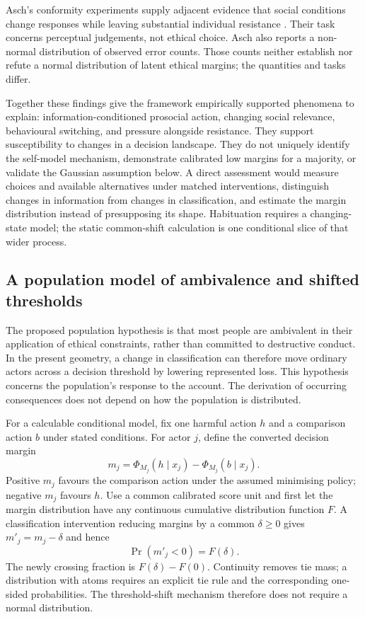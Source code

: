 \documentclass[11pt,a4paper]{article}
\theoremstyle{remark}
\begin{document}
Asch's conformity experiments supply adjacent evidence that social conditions
change responses while leaving substantial individual resistance
\citep{asch1956independence}. Their task concerns perceptual judgements, not
ethical choice. Asch also reports a non-normal distribution of observed error
counts. Those counts neither establish nor refute a normal distribution of
latent ethical margins; the quantities and tasks differ.

Together these findings give the framework empirically supported phenomena to
explain: information-conditioned prosocial action, changing social relevance,
behavioural switching, and pressure alongside resistance. They support
susceptibility to changes in a decision landscape. They do not uniquely identify
the self-model mechanism, demonstrate calibrated low margins for a majority,
or validate the Gaussian assumption below. A direct assessment would measure
choices and available alternatives under matched interventions, distinguish
changes in information from changes in classification, and estimate the
margin distribution instead of presupposing its shape. Habituation requires a
changing-state model; the static common-shift calculation is one conditional
slice of that wider process.

\subsection{A population model of ambivalence and shifted thresholds}

The proposed population hypothesis is that most people are ambivalent in their
application of ethical constraints, rather than committed to destructive conduct.
In the present geometry, a change in classification can therefore move ordinary
actors across a decision threshold by lowering represented loss. This hypothesis
concerns the population's response to the account. The derivation of occurring
consequences does not depend on how the population is distributed.

For a calculable conditional model, fix one harmful action $h$ and a comparison
action $b$ under stated conditions. For actor $j$, define the converted decision
margin
\begin{equation}\label{eq:population-margin}
m_j=\Phi_{M_j}(h\mid x_j)-\Phi_{M_j}(b\mid x_j).
\end{equation}
Positive $m_j$ favours the comparison action under the assumed minimising policy;
negative $m_j$ favours $h$. Use a common calibrated score unit and first let the
margin distribution have any continuous cumulative distribution function $F$.
A classification intervention reducing margins by a common $\delta\geq0$ gives
$m'_j=m_j-\delta$ and hence
\begin{equation}\label{eq:population-general}
\Pr(m'_j<0)=F(\delta).
\end{equation}
The newly crossing fraction is $F(\delta)-F(0)$. Continuity removes tie mass;
a distribution with atoms requires an explicit tie rule and the corresponding
one-sided probabilities. The threshold-shift mechanism therefore does not
require a normal distribution.
\end{document}
